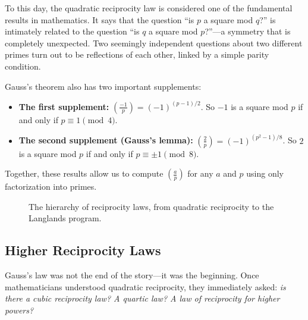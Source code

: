 To this day, the quadratic reciprocity law is considered one of the fundamental results in mathematics. It says that the question ``is $p$ a square mod $q$?'' is intimately related to the question ``is $q$ a square mod $p$?''---a symmetry that is completely unexpected. Two seemingly independent questions about two different primes turn out to be reflections of each other, linked by a simple parity condition.

Gauss's theorem also has two important supplements:
\begin{itemize}
    \item \textbf{The first supplement:} $\left(\frac{-1}{p}\right) = (-1)^{(p-1)/2}$. So $-1$ is a square mod $p$ if and only if $p \equiv 1 \pmod{4}$.
    \item \textbf{The second supplement (Gauss's lemma):} $\left(\frac{2}{p}\right) = (-1)^{(p^2-1)/8}$. So $2$ is a square mod $p$ if and only if $p \equiv \pm 1 \pmod{8}$.
\end{itemize}

Together, these results allow us to compute $\left(\frac{a}{p}\right)$ for any $a$ and $p$ using only factorization into primes.

\begin{figure}[htbp]
\centering
{}
\caption{The hierarchy of reciprocity laws, from quadratic reciprocity to the Langlands program.}
\label{fig:reciprocity-hierarchy}
\end{figure}

\subsection{Higher Reciprocity Laws}

Gauss's law was not the end of the story---it was the beginning. Once mathematicians understood quadratic reciprocity, they immediately asked: \emph{is there a cubic reciprocity law? A quartic law? A law of reciprocity for higher powers?}

